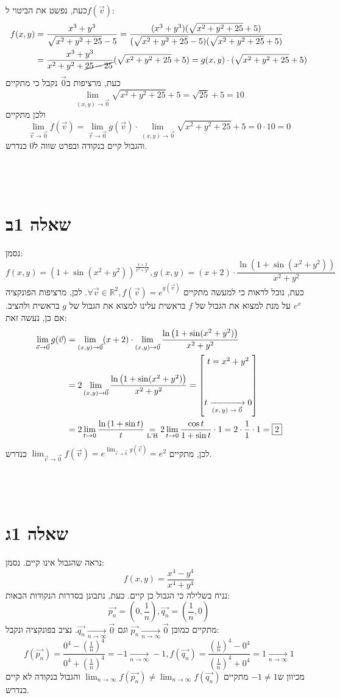 \documentclass[11pt, oneside]{article}
\newcommand{\qed}{\R{$\blacksquare$}}
\newcommand{\br}{\\\\\\\\}
\newcommand{\opr}[1]{\xrightarrow[\text{#1}]{}}
\newcommand{\ueq}[1]{\underset{\text{#1}}{=}}
\newcommand{\mR}{\mathbb{R}}
\newcommand{\sub}[4]{\begin{bmatrix} #1 = #2\br #1 \opr{$(x, y) \to #3$} #4\end{bmatrix}}
\begin{document}
כעת, נפשט את הביטוי ל$f(\vec{v})$:
\begin{align*}
f(x, y)
&= \frac{x^{3} + y^{3}}{\sqrt{x^{2} + y^{2} + 25} - 5}
= \frac{(x^{3} + y^{3})(\sqrt{x^{2} + y^{2} + 25} + 5)}{(\sqrt{x^{2} + y^{2} + 25} - 5)(\sqrt{x^{2} + y^{2} + 25} + 5)}\\
&= \frac{x^{3} + y^{3}}{x^{2} + y^{2} + \cancel{25 - 25}}(\sqrt{x^{2} + y^{2} + 25} + 5)
= g(x, y) \cdot (\sqrt{x^{2} + y^{2} + 25} + 5)
\end{align*}
כעת, מרציפות ב$\vec{0}$ נקבל כי מתקיים
\[
\lim_{(x, y) \to \vec{0}} \sqrt{x^{2} + y^{2} + 25} + 5 = \sqrt{25} + 5 = 10
\]
ולכן מתקיים 
\[
\lim_{\vec{v} \to \vec{0}} f(\vec{v})
= \lim_{\vec{v} \to \vec{0}} g(\vec{v}) \cdot \lim_{(x, y) \to \vec{0}} \sqrt{x^{2} + y^{2} + 25} + 5
= 0 \cdot 10 = 0
\]
והגבול קיים בנקודה ובפרט שווה ל0 כנדרש.
\br\qed
\clearpage

\section*{שאלה 1ב}
נסמן:
\[
f(x, y) = \left(1 + \sin(x^{2} + y^{2})\right)^{\frac{x + 2}{x^{2} + y^{2}}},
g(x, y) = (x + 2) \cdot \frac{\ln\left(1 + \sin(x^{2} + y^{2})\right)}{x^{2} + y^{2}}
\]
כעת, נוכל לראות כי למעשה מתקיים $\forall \vec{v} \in \mR^{2}, f(\vec{v}) = e^{g(\vec{v})}$. לכן, מרציפות הפונקציה $e^{x}$ על מנת למצוא את הגבול של $f$ בראשית עלינו למצוא את הגבול של $g$ בראשית ולהציב. אם כן, נעשה זאת:
\begin{align*}
\lim_{\vec{v} \to \vec{0}} g(\vec{v})
&= \lim_{(x, y) \to \vec{0}} (x + 2) \cdot \lim_{(x, y) \to \vec{0}} \frac{\ln\left(1 + \sin(x^{2} + y^{2})\right)}{x^{2} + y^{2}}\\
&= 2\lim_{(x, y) \to \vec{0}} \frac{\ln\left(1 + \sin(x^{2} + y^{2})\right)}{x^{2} + y^{2}}
= \sub{t}{x^{2} + y^{2}}{\vec{0}}{0}\\
&= 2\lim_{t \to 0} \frac{\ln\left(1 + \sin{t}\right)}{t}
\ueq{L'H} 2\lim_{t \to 0} \frac{\cos{t}}{1 + \sin{t}} \cdot 1 = 2 \cdot \frac{1}{1} \cdot 1 = \framebox{$2$}
\end{align*}
לכן, מתקיים $\lim_{\vec{v} \to \vec{0}} f(\vec{v}) = e^{\lim_{\vec{v} \to \vec{0}} g(\vec{v})} = e^{2}$ כנדרש.
\br\qed

\section*{שאלה 1ג}
נראה שהגבול אינו קיים. נסמן:
\[
f(x, y) = \frac{x^{4} - y^{4}}{x^{4} + y^{4}}
\]
נניח בשלילה כי הגבול כן קיים. כעת, נתבונן בסדרות הנקודות הבאות:
\[
\vec{p_{n}} = \left(0, \frac{1}{n}\right),
\vec{q_{n}} = \left(\frac{1}{n}, 0\right)
\]
מתקיים כמובן $\vec{p_{n}} \opr{$n \to \infty$} \vec{0}$ וגם $\vec{q_{n}} \opr{$n \to \infty$} \vec{0}$. נציב בפונקציה ונקבל:
\[
f(\vec{p_{n}}) = \frac{0^{4} - \left(\frac{1}{n}\right)^{4}}{0^{4} + \left(\frac{1}{n}\right)^{4}} = -1 \opr{$n \to \infty$} -1,
f(\vec{q_{n}}) = \frac{\left(\frac{1}{n}\right)^{4} - 0^{4}}{\left(\frac{1}{n}\right)^{4} + 0^{4}} = 1 \opr{$n \to \infty$} 1
\]
מכיוון ש$-1 \neq 1$ מתקיים $\lim_{n \to \infty} f(\vec{p_{n}}) \neq \lim_{n \to \infty} f(\vec{q_{n}})$ והגבול בנקודה לא קיים כנדרש.
\br\qed
\clearpage
\end{document}

